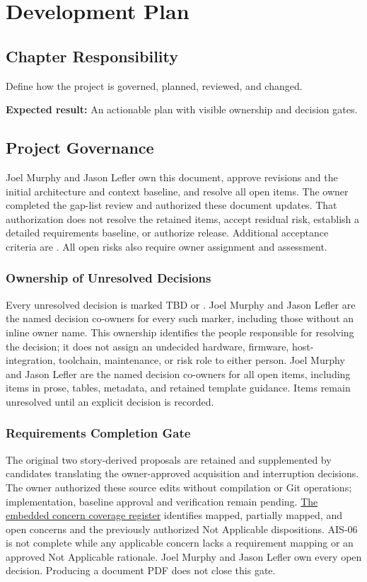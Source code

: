 \chapter{Development Plan}
\section{Chapter Responsibility}
\label{Section:DevelopmentPlanResponsibility}
Define how the project is governed, planned, reviewed, and changed.

\noindent\textbf{Expected result:} An actionable plan with visible ownership and decision gates.

\section{Project Governance}
\label{Section:ProjectGovernance}
Joel Murphy and Jason Lefler own this document, approve revisions and the initial architecture
and context baseline, and resolve all open \OwnedTBD{} items. The owner completed the
gap-list review and authorized these document updates. That authorization does
not resolve the retained \OwnedTBD{} items, accept residual risk, establish a detailed
requirements baseline, or authorize release. Additional acceptance criteria
are \OwnedTBD{}. All open risks also require owner assignment and assessment.

\subsection{Ownership of Unresolved Decisions}
\label{Section:TBDDecisionOwnership}
Every unresolved decision is marked TBD or \OwnedTBD{}. Joel Murphy and Jason Lefler are
the named decision co-owners for every such marker, including those without an
inline owner name. This ownership identifies
the people responsible for resolving the decision; it does not assign an
undecided hardware, firmware, host-integration, toolchain, maintenance, or risk
role to either person. Joel Murphy and Jason Lefler are the named decision co-owners for all open
items, including items in prose, tables, metadata, and retained template
guidance. Items remain unresolved until an explicit decision is recorded.

\subsection{Requirements Completion Gate}
\label{Section:RequirementsCompletionGate}
The original two story-derived proposals are retained and supplemented by
candidates translating the owner-approved acquisition and interruption
decisions. The owner authorized these source edits without compilation or
Git operations; implementation, baseline approval and verification remain pending. \hyperref[Table:ProjectProfileConcernCoverage]{The embedded
concern coverage register} identifies mapped, partially mapped, and open
concerns and the previously authorized Not Applicable dispositions.
AIS-06 is not complete while any applicable concern lacks a requirement
mapping or an approved Not Applicable rationale. Joel Murphy and Jason Lefler own every open
decision. Producing a document PDF does not close this gate.

